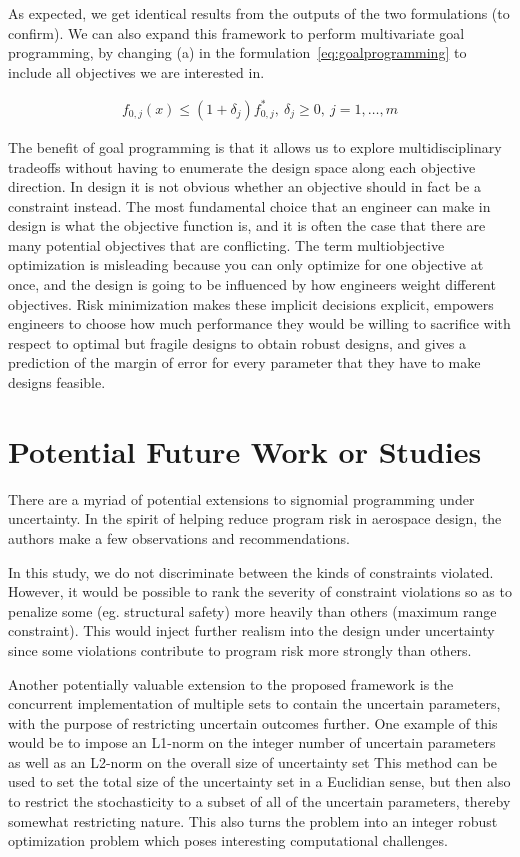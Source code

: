 As expected, we get identical results from the outputs of the two formulations (to confirm).
We can also expand this framework to perform multivariate goal programming,
by changing (a) in the formulation~\ref{eq:goalprogramming} to include all
objectives we are interested in.

\begin{align*}
    f_{0,j}(x) \leq (1+\delta_j) f^*_{0,j},~\delta_j \geq 0,~j = 1,\ldots, m
    \label{eq:multigoal}
\end{align*}

The benefit of goal programming is that it allows us to explore multidisciplinary tradeoffs without
having to enumerate the design space along each objective direction.
In design it is not obvious whether an objective should in fact be a constraint instead. The most
fundamental choice that an engineer can make in design is what the objective function is, and it is
often the case that there are many potential objectives that are conflicting. The term multiobjective optimization is misleading
because you can only optimize for one objective at once,
and the design is going to be influenced by how engineers weight different objectives.
Risk minimization makes these implicit decisions explicit, empowers engineers to choose
how much performance they would be willing to sacrifice with respect
to optimal but fragile designs to obtain robust designs, and gives a prediction of the margin of error
for every parameter that they have to make designs feasible.

\section{Potential Future Work or Studies}

There are a myriad of potential extensions to signomial programming under uncertainty.
In the spirit of helping reduce program risk in aerospace design,
the authors make a few observations and recommendations.

In this study, we do not discriminate between the kinds of constraints violated. However, it would
be possible to rank the severity of constraint violations so as to penalize some (eg. structural safety)
more heavily than others (maximum range constraint). This would inject further realism into the
design under uncertainty since some violations contribute to program risk more
strongly than others.

Another potentially valuable extension to the proposed framework is the concurrent implementation
of multiple sets to contain the uncertain parameters, with the purpose of restricting uncertain
outcomes further. One example of this would be to impose an  L1-norm on the integer number of uncertain parameters
as well as an L2-norm on the overall size of uncertainty set
This method can be used to set the total size of the uncertainty set in a Euclidian sense,
but then also to restrict the stochasticity to a subset of all of the uncertain parameters,
thereby somewhat restricting nature. This also turns the problem into an integer robust
optimization problem which poses interesting computational challenges.


